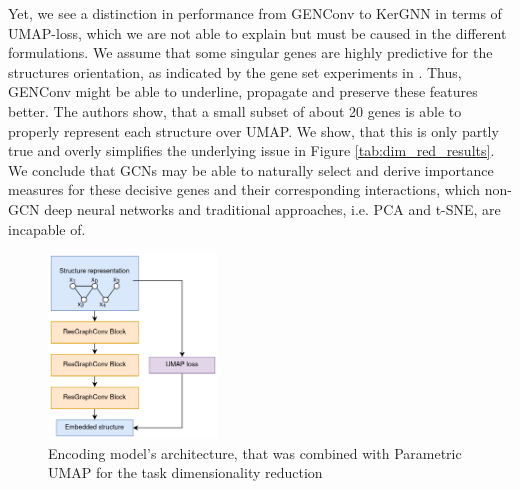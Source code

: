 \documentclass[]{article}
\begin{document}
Yet, we see a distinction in performance from GENConv to KerGNN in terms of UMAP-loss, which we are not able to explain but must be caused in the different formulations. We assume that some singular genes are highly predictive for the structures orientation, as indicated by the gene set experiments in \citet{Partel2020}. Thus, GENConv might be able to underline, propagate and preserve these features better. The authors show, that a small subset of about 20 genes is able to properly represent each structure over UMAP. We show, that this is only partly true and overly simplifies the underlying issue in Figure \ref{tab:dim_red_results}. We conclude that GCNs may be able to naturally select and derive importance measures for these decisive genes and their corresponding interactions, which non-GCN deep neural networks and traditional approaches, i.e. PCA and t-SNE, are incapable of.

\begin{figure}
	\centering
	\includegraphics[width=0.4\textwidth]{figures/Dim_red_model_GCN.png}
	\caption{Encoding model's architecture, that was combined with Parametric UMAP for the task dimensionality reduction}
	\label{fig:dim_red_mdel}
\end{figure}
\end{document}
